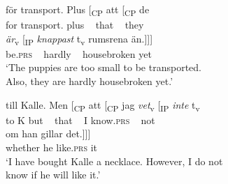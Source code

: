 \documentclass[output=paper,colorlinks,citecolor=brown,draft,draftmode]{langscibook}
\begin{document}
\gll     för    transport.  Plus  [\textsubscript{CP}  att      [\textsubscript{CP}  de\\
    for    transport.  plus   ~ that   ~   they     \\
\gll     \textit{{är}}\textsubscript{v} [\textsubscript{IP}    \textit{{knappast}} t\textsubscript{v}   rumsrena      än.]]]  \\
    be.\textsc{prs}  ~  hardly  ~     housebroken    yet\\
\glt `The puppies are too small to be transported.   \\
    Also, they are hardly housebroken yet.’  \\


\gll     till    Kalle.  Men [\textsubscript{CP}  att [\textsubscript{CP}  jag  \textit{{vet}}\textsubscript{v} [\textsubscript{IP}    \textit{{inte}} t\textsubscript{v}   \\
    to    K    but   ~ that  ~  I    know.\textsc{prs} ~ not ~ \\
\gll     om      han  gillar      det.]]]  \\
    whether  he    like.\textsc{prs}    it\\
\glt `I have bought Kalle a necklace. However, I do not   \\
    know if he will like it.’
\z
\z
\end{document}

